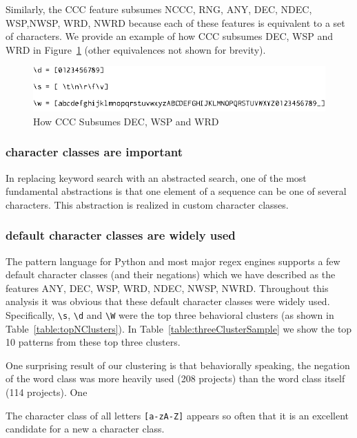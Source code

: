 Similarly, the CCC feature subsumes NCCC, RNG, ANY, DEC, NDEC, WSP,NWSP, WRD, NWRD because each of these features is equivalent to a set of characters.  We provide an example of how CCC subsumes DEC, WSP and WRD in Figure~\ref{fig:CCCequivalences} (other equivalences not shown for brevity).

\begin{figure}[htb]
\centering
\includegraphics[width=\columnwidth]{../illustrations/CCCequivalences.eps}
\caption{How CCC Subsumes DEC, WSP and WRD}
\label{fig:CCCequivalences}
\end{figure}

\subsubsection{character classes are important}
In replacing keyword search with an abstracted search, one of the most fundamental abstractions is that one element of a sequence can be one of several characters.  This abstraction is realized in custom character classes.

\subsubsection{default character classes are widely used}

The pattern language for Python and most major regex engines supports a few default character classes (and their negations) which we have described as the features ANY, DEC, WSP, WRD, NDEC, NWSP, NWRD.  Throughout this analysis it was obvious that these default character classes were widely used. Specifically, \verb!\s!, \verb!\d! and \verb!\W! were the top three behavioral clusters (as shown in Table~\ref{table:topNClusters}).  In Table~\ref{table:threeClusterSample} we show the top 10 patterns from these top three clusters.



One surprising result of our clustering is that behaviorally speaking, the negation of the word class was more heavily used (208 projects) than the word class itself (114 projects).  One

The character class of all letters \verb![a-zA-Z]! appears so often that it is an excellent candidate for a new a character class.

